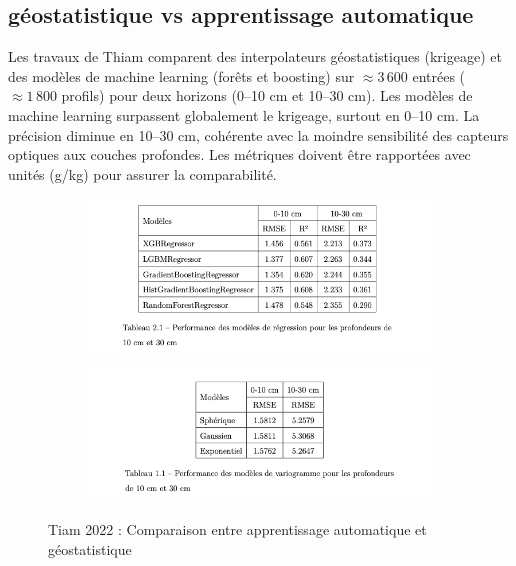 \documentclass[12pt,a4paper,oneside]{report}
\begin{document}
\subsection{ géostatistique vs apprentissage automatique}
Les travaux de Thiam  comparent des interpolateurs géostatistiques (krigeage) et des modèles de machine learning (forêts et boosting) sur \( \approx 3\,600 \) entrées (\( \approx 1\,800 \) profils) pour deux horizons (0–10 cm et 10–30 cm). Les modèles de machine learning surpassent globalement le krigeage, surtout en 0–10 cm. La précision diminue en 10–30 cm, cohérente avec la moindre sensibilité des capteurs optiques aux couches profondes. Les métriques doivent être rapportées avec unités (g/kg) pour assurer la comparabilité.
\begin{figure}[h]
    \centering
    \begin{subfigure}{0.48\textwidth}
        \centering
        \includegraphics[width=\linewidth]{images/ml.png}
        \label{fig:ml}
    \end{subfigure}%
    \hfill
    \begin{subfigure}{0.48\textwidth}
        \centering
        \includegraphics[width=\linewidth]{images/geostatistique.png}
        \label{fig:geostat}
    \end{subfigure}
    \caption{Tiam 2022 : Comparaison entre apprentissage automatique et géostatistique}
    \label{fig:ml_vs_geostat}
\end{figure}
\end{document}
